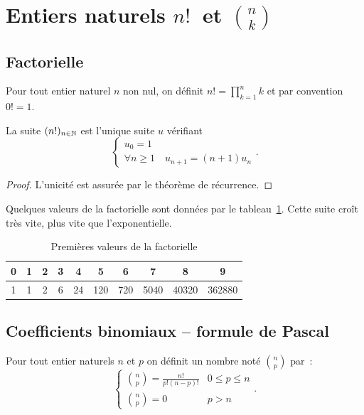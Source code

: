 \section{Entiers naturels \(n!~\) et \(\binom{n}{k}\)}

\subsection{Factorielle}

\begin{defdef}
  Pour tout entier naturel \(n\) non nul, on définit \(n! = \prod_{k = 1}^n k\) 
  et par convention \(0! = 1\).
\end{defdef}

\begin{prop}
  La suite \((n!)_{n\in\mathbb{N}}\) est l'unique suite \(u\) vérifiant
  \begin{equation}
    \begin{cases}
      u_0 = 1 \\
      \forall n\geqslant 1 \quad u_{n + 1} = (n + 1) u_n
    \end{cases}.
  \end{equation}
\end{prop}
\begin{proof}
  L'unicité est assurée par le théorème de récurrence.
\end{proof}
Quelques valeurs de la factorielle sont données par le 
tableau~\ref{tab:factorielle}. Cette suite croît très vite, plus vite que 
l'exponentielle.

\begin{table}[h]
  \centering
  \begin{tabular}{|c|c|c|c|c|c|c|c|c|c|}
    \hline
    0 & 1 & 2 & 3 & 4  & 5   & 6   & 7    & 8     & 9 \\ \hline
    1 & 1 & 2 & 6 & 24 & 120 & 720 & 5040 & 40320 & 362880 \\ \hline
  \end{tabular}
  \caption{Premières valeurs de la factorielle}
  \label{tab:factorielle}
\end{table}

\subsection{Coefficients binomiaux -- formule de Pascal}

\begin{defdef}
  Pour tout entier naturels \(n\) et \(p\) on définit un nombre noté 
  \(\binom{n}{p}\) par~:
  \begin{equation}
    \begin{cases}
      \binom{n}{p} = \frac{n!}{p!(n - p)!} & 0\leqslant p \leqslant n \\
      \binom{n}{p} = 0 & p > n
    \end{cases}.
  \end{equation}
\end{defdef}

